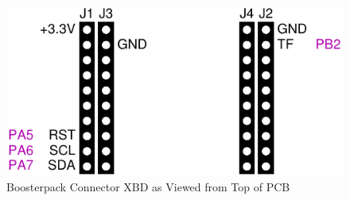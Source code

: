 \documentclass[twoside,11pt]{cergdoc}
\begin{document}
\begin{figure}[ht]
  \begin{center}
    \includegraphics[scale=1]{figures/xbp-xbd}
    \caption{Boosterpack Connector XBD as Viewed from Top of PCB}
  \end{center}
\end{figure}
\end{document}
